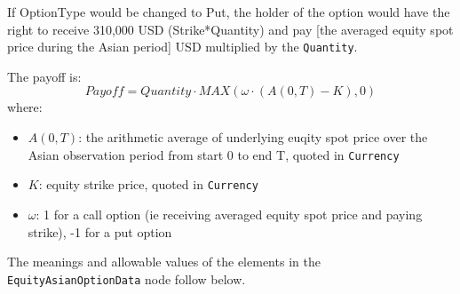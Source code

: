 If OptionType would be changed to Put, the holder of the option would have the right to receive 310,000 USD (Strike*Quantity) and pay [the averaged equity spot price during the Asian period] USD multiplied by the \lstinline!Quantity!. 

The payoff is: 
$$
Payoff = Quantity\cdot MAX(\omega\cdot(A(0,T) - K),0)
$$
where:
\begin{itemize}
	\item $A(0,T)$: the arithmetic average of underlying euqity spot price over the Asian observation period from start 0 to end T, quoted in \lstinline!Currency!
	\item $K$: equity strike price, quoted in \lstinline!Currency!
	\item $\omega$: 1 for a call option (ie receiving averaged equity spot price and paying strike), -1 for a put option
\end{itemize}

The meanings and allowable values of the elements in the \lstinline!EquityAsianOptionData!  node follow below.

